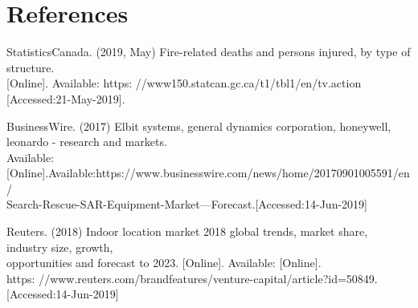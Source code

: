 

\setcounter{section}{3}
\section{References}

\bigskip

\begin{enumerate}[label={[\arabic*]}, leftmargin=*]
\item StatisticsCanada. (2019, May) Fire-related deaths and persons injured, by type of structure. \\
    {[Online]}. Available: https: //www150.statcan.gc.ca/t1/tbl1/en/tv.action \\
    {[Accessed:21-May-2019]}. \\

\item  BusinessWire. (2017) Elbit systems, general dynamics corporation, honeywell, leonardo - research and markets. \\
Available: {[Online]}.Available:https://www.businesswire.com/news/home/20170901005591/en/\\
Search-Rescue-SAR-Equipment-Market---Forecast.{[Accessed:14-Jun-2019]} \\

\item  Reuters. (2018) Indoor location market 2018 global trends, market share, industry size, growth, \\
opportunities and forecast to 2023. {[Online]}. Available: {[Online]}.\\
https: //www.reuters.com/brandfeatures/venture-capital/article?id=50849.[Accessed:14-Jun-2019]\\

\end{enumerate}